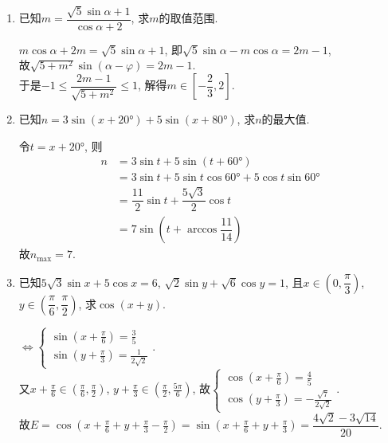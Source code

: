 \begin{enumerate}
\begin{jieda}
\begin{enumerate}[(1)]
\item $E=\sin\dfrac{\pi}{3}\cos2x-\cos\dfrac{\pi}{3}\sin2x+\cos\dfrac{\pi}{3}\cos2x-\sin\dfrac{\pi}{3}\sin2x=\dfrac{\sqrt{6}+\sqrt{2}}{2}\sin\left(2x+\dfrac{3\pi}{4}\right)$. 
\end{enumerate}
\end{jieda}

\item 已知$m=\dfrac{\sqrt{5}\sin\alpha+1}{\cos\alpha+2}$, 求$m$的取值范围. 
\begin{jieda}
$m\cos\alpha+2m=\sqrt{5}\sin\alpha+1$, 即$\sqrt{5}\sin\alpha-m\cos\alpha=2m-1$, \\
故$\sqrt{5+m^2}\sin(\alpha-\varphi)=2m-1$. \\
于是$-1\leq \dfrac{2m-1}{\sqrt{5+m^2}}\leq 1$, 解得$m\in\left[-\dfrac{2}{3},2\right]$. 
\end{jieda}

\item 已知$n=3\sin(x+\ang{20})+5\sin(x+\ang{80})$, 求$n$的最大值. 
\begin{jieda}
令$t=x+\ang{20}$, 则
\begin{align*}
n & =3\sin{t}+5\sin(t+\ang{60})\\
& = 3\sin{t}+5\sin{t}\cos\ang{60}+5\cos{t}\sin\ang{60}\\
& = \dfrac{11}{2}\sin{t}+\dfrac{5\sqrt{3}}{2}\cos{t}\\
& = 7\sin\left(t+\arccos\dfrac{11}{14}\right)
\end{align*}
故$n_{\max}=7$. 
\end{jieda}

\item 已知$5\sqrt{3}\sin{x}+5\cos{x}=6$, $\sqrt{2}\sin{y}+\sqrt{6}\cos{y}=1$, 
且$x\in\left(0,\dfrac{\pi}{3}\right)$, $y\in\left(\dfrac{\pi}{6},\dfrac{\pi}{2}\right)$, 
求$\cos(x+y)$. 
\begin{jieda}
$\iff\begin{cases}
\sin(x+\frac{\pi}{6})=\frac{3}{5}\\
\sin(y+\frac{\pi}{3})=\frac{1}{2\sqrt{2}}
\end{cases}$. \\
又$x+\frac{\pi}{6}\in(\frac{\pi}{6},\frac{\pi}{2})$, $y+\frac{\pi}{3}\in(\frac{\pi}{2},\frac{5\pi}{6})$, 
故$\begin{cases}
\cos(x+\frac{\pi}{6})=\frac{4}{5}\\
\cos(y+\frac{\pi}{3})=-\frac{\sqrt{7}}{2\sqrt{2}}
\end{cases}$. \\
故$E=\cos(x+\frac{\pi}{6}+y+\frac{\pi}{3}-\frac{\pi}{2})=\sin(x+\frac{\pi}{6}+y+\frac{\pi}{3})=\dfrac{4\sqrt{2}-3\sqrt{14}}{20}$. 
\end{jieda}

\end{enumerate}






